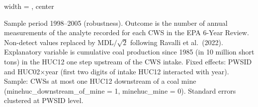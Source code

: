 \begin{table}[htbp]
\begin{adjustbox}{width = \textwidth, center}
      
   \end{adjustbox}
      {\tiny\linespread{1}\selectfont \par \raggedright 
   Sample period 1998--2005 (robustness). Outcome is the number of annual measurements of the analyte recorded for each CWS in the EPA 6-Year Review. Non-detect values replaced by MDL$/\sqrt{2}$ following Ravalli et al.~(2022). Explanatory variable is cumulative coal production since 1985 (in 10 million short tons) in the HUC12 one step upstream of the CWS intake. Fixed effects: PWSID and HUC02$\times$year (first two digits of intake HUC12 interacted with year). Sample: CWSs at most one HUC12 downstream of a coal mine (minehuc\_downstream\_of\_mine = 1, minehuc\_mine = 0). Standard errors clustered at PWSID level.}
   
\end{table}


